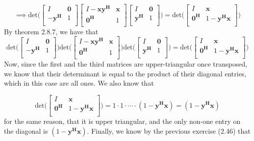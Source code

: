 \documentclass[letterpaper,12pt]{article}
\theoremstyle{definition}
\begin{document}
\[
\implies 
\text{det}\Big(  
\begin{bmatrix}
    I & \mathbf{0} \\
    -\mathbf{y^H} & 1 \\
\end{bmatrix}
\begin{bmatrix}
    I-\mathbf{xy^H} & \mathbf{x} \\
    \mathbf{0^H} & 1 \\
\end{bmatrix}
\begin{bmatrix}
    I & \mathbf{0} \\
    \mathbf{y^H} & 1 \\
\end{bmatrix} \Big)
=\text{det} \Big(
\begin{bmatrix}
    I & \mathbf{x} \\
    \mathbf{0^H} & 1-\mathbf{y^Hx}  \\
\end{bmatrix} \Big)
\]
By theorem 2.8.7, we have that
\[
\text{det}\Big(  
\begin{bmatrix}
    I & \mathbf{0} \\
    -\mathbf{y^H} & 1 \\
\end{bmatrix}
 \Big) \text{det}  \Big(
\begin{bmatrix}
    I-\mathbf{xy^H} & \mathbf{x} \\
    \mathbf{0^H} & 1 \\
\end{bmatrix}
 \Big) \text{det}  \Big(
\begin{bmatrix}
    I & \mathbf{0} \\
    \mathbf{y^H} & 1 \\
\end{bmatrix} \Big)
=\text{det} \Big(
\begin{bmatrix}
    I & \mathbf{x} \\
    \mathbf{0^H} & 1-\mathbf{y^Hx}  \\
\end{bmatrix} \Big)
\]
Now, since the first and the third matrices are upper-triangular once transposed, we know that their determinant is equal to the product of their diagonal entries, which in this case are all ones. We also know that 

\[
\text{det} \Big(
\begin{bmatrix}
    I & \mathbf{x} \\
    \mathbf{0^H} & 1-\mathbf{y^Hx}  \\
\end{bmatrix} \Big)
= 1 \cdot 1 \cdot \cdots \cdot (1- \mathbf{y^Hx}) =(1- \mathbf{y^Hx}  )
\]
for the same reason, that it is upper triangular, and the only non-one entry on the diagonal is $(1- \mathbf{y^Hx} )$.
Finally, we know by the previous exercise (2.46) that
\end{document}
